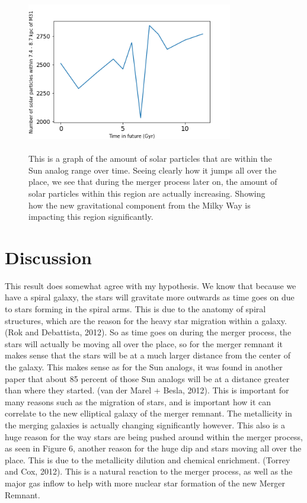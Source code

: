 \documentclass[fleqn,usenatbib]{mnras}
\begin{document}
\begin{figure}
\graphicspath{ {/home/} }
\includegraphics[width=9cm, height=7cm]{graphofsolarparticles}
\caption{This is a graph of the amount of solar particles that are within the Sun analog range over time. Seeing clearly how it jumps all over the place, we see that during the merger process later on, the amount of solar particles within this region are actually increasing. Showing how the new gravitational component from the Milky Way is impacting this region significantly.
}

\end{figure}


\section{Discussion}

This result does somewhat agree with my hypothesis. We know that because we have a spiral galaxy, the stars will gravitate more outwards as time goes on due to stars forming in the spiral arms. This is due to the anatomy of spiral structures, which are the reason for the heavy star migration within a galaxy. (Rok and Debattista, 2012). So as time goes on during the merger process, the stars will actually be moving all over the place, so for the merger remnant it makes sense that the stars will be at a much larger distance from the center of the galaxy. This makes sense as for the Sun analogs, it was found in another paper that about 85 percent of those Sun analogs will be at a distance greater than where they started. (van der Marel + Besla, 2012). This is important for many reasons such as the migration of stars, and is important how it can correlate to the new elliptical galaxy of the merger remnant. The metallicity in the merging galaxies is actually changing significantly however. This also is a huge reason for the way stars are being pushed around within the merger process, as seen in Figure 6, another reason for the huge dip and stars moving all over the place. This is due to the metallicity dilution and chemical enrichment. (Torrey and Cox, 2012). This is a natural reaction to the merger process, as well as the major gas inflow to help with more nuclear star formation of the new Merger Remnant. 
\end{document}
